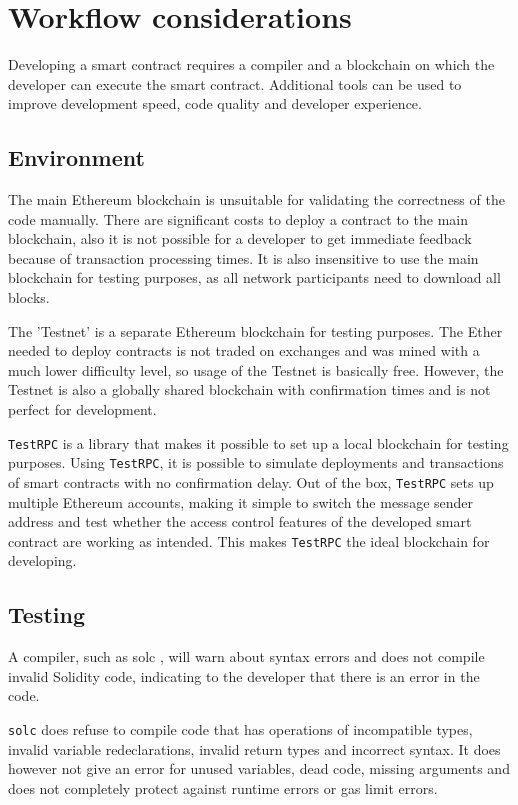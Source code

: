 \section{Workflow considerations}
Developing a smart contract requires a compiler and a blockchain on which the developer can execute the smart contract. Additional tools can be used to improve development speed, code quality and developer experience.

\subsection{Environment}

The main Ethereum blockchain is unsuitable for validating the correctness of the code manually. There are significant costs to deploy a contract to the main blockchain, also it is not possible for a developer to get immediate feedback because of transaction processing times. It is also insensitive to use the main blockchain for testing purposes, as all network participants need to download all blocks.

The 'Testnet' is a separate Ethereum blockchain for testing purposes. The Ether needed to deploy contracts is not traded on exchanges and was mined with a much lower difficulty level, so usage of the Testnet is basically free. However, the Testnet is also a globally shared blockchain with confirmation times and is not perfect for development. 

\texttt{TestRPC} \cite{TestRPC} is a library that makes it possible to set up a local blockchain for testing purposes. Using \texttt{TestRPC}, it is possible to simulate deployments and transactions of smart contracts with no confirmation delay. Out of the box, \texttt{TestRPC} sets up multiple Ethereum accounts, making it simple to switch the message sender address and test whether the access control features of the developed smart contract are working as intended. This makes \texttt{TestRPC} the ideal blockchain for developing.

\subsection{Testing}

A compiler, such as solc \cite{Solc}, will warn about syntax errors and does not compile invalid Solidity code, indicating to the developer that there is an error in the code.

\texttt{solc} does refuse to compile code that has operations of incompatible types, invalid variable redeclarations, invalid return types and incorrect syntax. 
It does however not give an error for unused variables, dead code, missing arguments and does not completely protect against runtime errors or gas limit errors.

